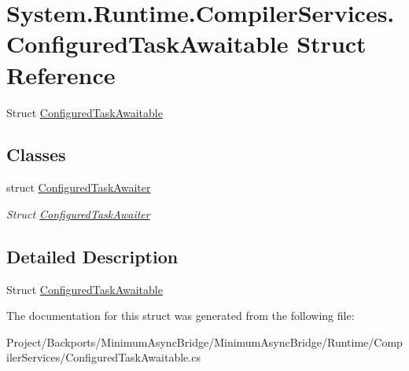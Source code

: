 \hypertarget{struct_system_1_1_runtime_1_1_compiler_services_1_1_configured_task_awaitable}{}\section{System.\+Runtime.\+Compiler\+Services.\+Configured\+Task\+Awaitable Struct Reference}
\label{struct_system_1_1_runtime_1_1_compiler_services_1_1_configured_task_awaitable}


Struct \hyperlink{struct_system_1_1_runtime_1_1_compiler_services_1_1_configured_task_awaitable}{Configured\+Task\+Awaitable}  


\subsection*{Classes}
\begin{DoxyCompactItemize}
\item 
struct \hyperlink{struct_system_1_1_runtime_1_1_compiler_services_1_1_configured_task_awaitable_1_1_configured_task_awaiter}{Configured\+Task\+Awaiter}
\begin{DoxyCompactList}\small\item\em Struct \hyperlink{struct_system_1_1_runtime_1_1_compiler_services_1_1_configured_task_awaitable_1_1_configured_task_awaiter}{Configured\+Task\+Awaiter} \end{DoxyCompactList}\end{DoxyCompactItemize}


\subsection{Detailed Description}
Struct \hyperlink{struct_system_1_1_runtime_1_1_compiler_services_1_1_configured_task_awaitable}{Configured\+Task\+Awaitable} 



The documentation for this struct was generated from the following file\+:\begin{DoxyCompactItemize}
\item 
Project/\+Backports/\+Minimum\+Async\+Bridge/\+Minimum\+Async\+Bridge/\+Runtime/\+Compiler\+Services/Configured\+Task\+Awaitable.\+cs\end{DoxyCompactItemize}
